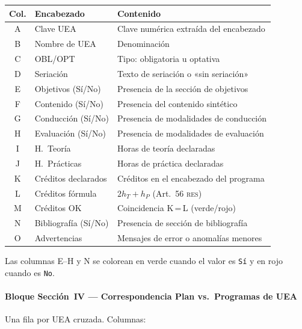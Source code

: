 \documentclass[11pt,a4paper]{article}
\newcommand{\RES}{\textsc{res}}
\begin{document}
\begin{center}
\renewcommand{\arraystretch}{1.15}
\begin{tabular}{clp{7cm}}
\toprule
\textbf{Col.} & \textbf{Encabezado} & \textbf{Contenido} \\
\midrule
A & Clave UEA               & Clave numérica extraída del encabezado \\
B & Nombre de UEA           & Denominación \\
C & OBL/OPT                 & Tipo: obligatoria u optativa \\
D & Seriación               & Texto de seriación o «sin seriación» \\
E & Objetivos (Sí/No)       & Presencia de la sección de objetivos \\
F & Contenido (Sí/No)       & Presencia del contenido sintético \\
G & Conducción (Sí/No)      & Presencia de modalidades de conducción \\
H & Evaluación (Sí/No)      & Presencia de modalidades de evaluación \\
I & H.\ Teoría              & Horas de teoría declaradas \\
J & H.\ Prácticas           & Horas de práctica declaradas \\
K & Créditos declarados     & Créditos en el encabezado del programa \\
L & Créditos fórmula        & $2h_T + h_P$ (Art.\ 56 \RES{}) \\
M & Créditos OK             & Coincidencia K\,=\,L (verde/rojo) \\
N & Bibliografía (Sí/No)    & Presencia de sección de bibliografía \\
O & Advertencias            & Mensajes de error o anomalías menores \\
\bottomrule
\end{tabular}
\end{center}

\begin{notabox}
Las columnas E--H y N se colorean en verde cuando el valor es \texttt{Sí}
y en rojo cuando es \texttt{No}.
\end{notabox}

\paragraph{Bloque Sección~IV --- Correspondencia Plan vs.\ Programas de UEA}

Una fila por UEA cruzada. Columnas:
\end{document}
